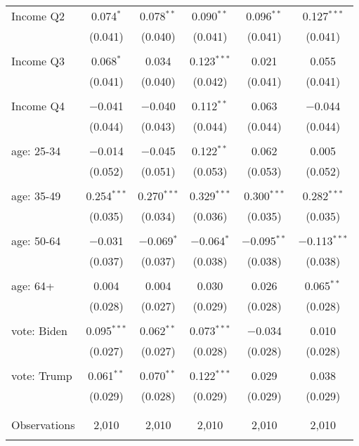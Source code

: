 \begin{tabular}{@{\extracolsep{5pt}}lccccc}
 Income Q2 & 0.074$^{*}$ & 0.078$^{**}$ & 0.090$^{**}$ & 0.096$^{**}$ & 0.127$^{***}$ \\ 
  & (0.041) & (0.040) & (0.041) & (0.041) & (0.041) \\ 
  & & & & & \\ 
 Income Q3 & 0.068$^{*}$ & 0.034 & 0.123$^{***}$ & 0.021 & 0.055 \\ 
  & (0.041) & (0.040) & (0.042) & (0.041) & (0.041) \\ 
  & & & & & \\ 
 Income Q4 & $-$0.041 & $-$0.040 & 0.112$^{**}$ & 0.063 & $-$0.044 \\ 
  & (0.044) & (0.043) & (0.044) & (0.044) & (0.044) \\ 
  & & & & & \\ 
 age: 25-34 & $-$0.014 & $-$0.045 & 0.122$^{**}$ & 0.062 & 0.005 \\ 
  & (0.052) & (0.051) & (0.053) & (0.053) & (0.052) \\ 
  & & & & & \\ 
 age: 35-49 & 0.254$^{***}$ & 0.270$^{***}$ & 0.329$^{***}$ & 0.300$^{***}$ & 0.282$^{***}$ \\ 
  & (0.035) & (0.034) & (0.036) & (0.035) & (0.035) \\ 
  & & & & & \\ 
 age: 50-64 & $-$0.031 & $-$0.069$^{*}$ & $-$0.064$^{*}$ & $-$0.095$^{**}$ & $-$0.113$^{***}$ \\ 
  & (0.037) & (0.037) & (0.038) & (0.038) & (0.038) \\ 
  & & & & & \\ 
 age: 64+ & 0.004 & 0.004 & 0.030 & 0.026 & 0.065$^{**}$ \\ 
  & (0.028) & (0.027) & (0.029) & (0.028) & (0.028) \\ 
  & & & & & \\ 
 vote: Biden & 0.095$^{***}$ & 0.062$^{**}$ & 0.073$^{***}$ & $-$0.034 & 0.010 \\ 
  & (0.027) & (0.027) & (0.028) & (0.028) & (0.028) \\ 
  & & & & & \\ 
 vote: Trump & 0.061$^{**}$ & 0.070$^{**}$ & 0.122$^{***}$ & 0.029 & 0.038 \\ 
  & (0.029) & (0.028) & (0.029) & (0.029) & (0.029) \\ 
  & & & & & \\ 
\hline \\[-1.8ex] 

Observations & 2,010 & 2,010 & 2,010 & 2,010 & 2,010 \\ 
\hline 
\hline \\[-1.8ex] 
\end{tabular} 